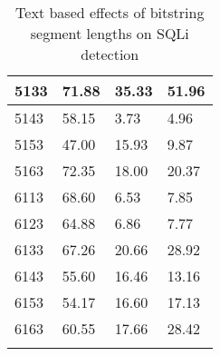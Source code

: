 \begin{appendices}
\begin{longtable}{|p{1.5in}|p{1in}|p{1in}|p{1in}|}
	5133 & 71.88 & 35.33 & 51.96 \\ \hline
	5143 & 58.15 &  3.73 &  4.96 \\ \hline
	5153 & 47.00 & 15.93 &  9.87 \\ \hline
	5163 & 72.35 & 18.00 & 20.37 \\ \hline
	6113 & 68.60 &  6.53 &  7.85 \\ \hline
	6123 & 64.88 &  6.86 &  7.77 \\ \hline
	6133 & 67.26 & 20.66 & 28.92 \\ \hline
	6143 & 55.60 & 16.46 & 13.16 \\ \hline
	6153 & 54.17 & 16.60 & 17.13 \\ \hline
	6163 & 60.55 & 17.66 & 28.42 \\ \hline
	\caption[]{Text based effects of bitstring segment lengths on SQLi detection}
	\label{app:sqlBitstringTest}
\end{longtable}


\end{appendices}
